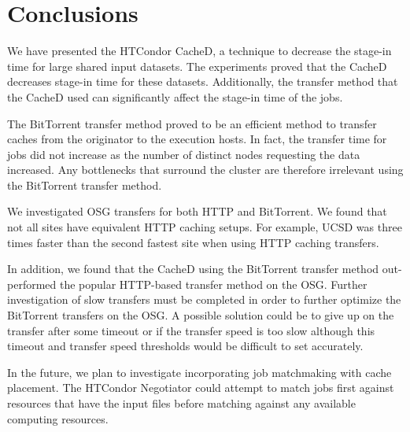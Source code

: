 \section{Conclusions}
We have presented the HTCondor CacheD, a technique to decrease the stage-in time for large shared input datasets.  The experiments proved that the CacheD decreases stage-in time for these datasets.  Additionally, the transfer method that the CacheD used can significantly affect the stage-in time of the jobs.

The BitTorrent transfer method proved to be an efficient method to transfer caches from the originator to the execution hosts.  In fact, the transfer time for jobs did not increase as the number of distinct nodes requesting the data increased.  Any bottlenecks that surround the cluster are therefore irrelevant using the BitTorrent transfer method.

We investigated OSG transfers for both HTTP and BitTorrent.  We found that not all sites have equivalent HTTP caching setups.  For example, UCSD was three times faster than the second fastest site when using HTTP caching transfers.

In addition, we found that the CacheD using the BitTorrent transfer method out-performed the popular HTTP-based transfer method on the OSG.  Further investigation of slow transfers must be completed in order to further optimize the BitTorrent transfers on the OSG.  A possible solution could be to give up on the transfer after some timeout or if the transfer speed is too slow although this timeout and transfer speed thresholds would be difficult to set accurately.


In the future, we plan to investigate incorporating job matchmaking with cache placement.  The HTCondor Negotiator could attempt to match jobs first against resources that have the input files before matching against any available computing resources.




